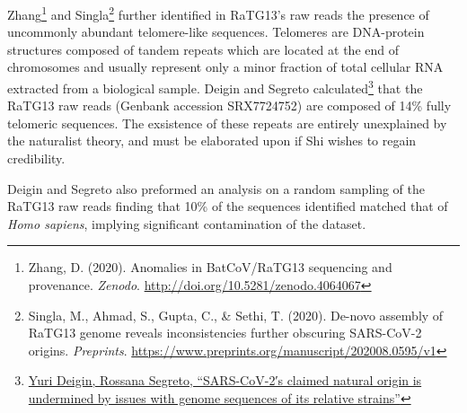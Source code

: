 \documentclass[11pt]{article}
\begin{document}
Zhang\footnote{Zhang, D. (2020). Anomalies in BatCoV/RaTG13 sequencing and provenance. \emph{Zenodo}. \url{http://doi.org/10.5281/zenodo.4064067}} and Singla\footnote{Singla, M., Ahmad, S., Gupta, C., \& Sethi, T. (2020). De-novo assembly of RaTG13 genome reveals inconsistencies further obscuring SARS-CoV-2 origins. \emph{Preprints}. \url{https://www.preprints.org/manuscript/202008.0595/v1}} further identified in RaTG13’s raw reads the presence of uncommonly abundant telomere-like sequences. Telomeres are DNA-protein structures composed of tandem repeats which are located at the end of chromosomes and usually represent only a minor fraction of total cellular RNA extracted from a biological sample. Deigin and Segreto calculated\footnote{\href{https://onlinelibrary.wiley.com/doi/pdfdirect/10.1002/bies.202100015}{Yuri Deigin, Rossana Segreto, ``SARS-CoV-2′s claimed natural origin is undermined by issues with genome sequences of its relative strains''}} that the RaTG13 raw reads (Genbank accession SRX7724752) are composed of 14\% fully telomeric sequences. The exsistence of these repeats are entirely unexplained by the naturalist theory, and must be elaborated upon if Shi wishes to regain credibility.

Deigin and Segreto also preformed an analysis on a random sampling of the RaTG13 raw reads finding that 10\% of the sequences identified matched that of \emph{Homo sapiens}, implying significant contamination of the dataset.
\end{document}
